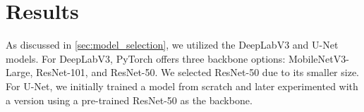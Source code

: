 \section{Results}
As discussed in \autoref{sec:model_selection}, we utilized the DeepLabV3 and U-Net models. For DeepLabV3, PyTorch offers three backbone options: MobileNetV3-Large, ResNet-101, and ResNet-50. We selected ResNet-50 due to its smaller size. For U-Net, we initially trained a model from scratch and later experimented with a version using a pre-trained ResNet-50 as the backbone.


